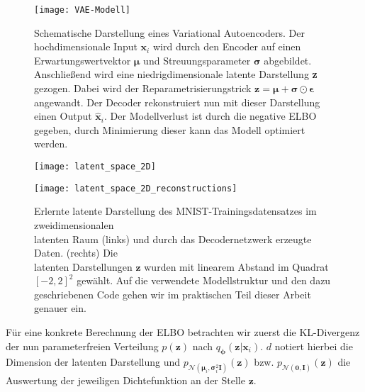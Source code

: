 \documentclass[12pt]{article}
\begin{document}
	\begin{figure}[h!]
		\centering
		\texttt{[image: VAE-Modell]}
		\captionsetup{labelformat=empty}
		\caption{Schematische Darstellung eines Variational Autoencoders. Der hochdimensionale Input $\mathbf{x}_i$ wird durch den Encoder auf einen Erwartungswertvektor $\boldsymbol{\mu}$ und Streuungsparameter $\boldsymbol{\sigma}$ abgebildet. Anschließend wird eine niedrigdimensionale latente Darstellung \textbf{z} gezogen. Dabei wird der Reparametrisierungstrick $\textbf{z}=\boldsymbol{\mu}+\boldsymbol{\sigma} \odot \boldsymbol{\epsilon}$ angewandt. Der Decoder rekonstruiert nun mit dieser Darstellung einen Output $\hat{\mathbf{x}}_i$. Der Modellverlust ist durch die negative ELBO gegeben, durch Minimierung dieser kann das Modell optimiert werden.\\}
		\centering
		\begin{minipage}{.5\textwidth}
			\centering
			\texttt{[image: latent\_space\_2D]}
		\end{minipage}%
		\begin{minipage}{.5\textwidth}
			\centering
			\texttt{[image: latent\_space\_2D\_reconstructions]}
		\end{minipage}
		\captionsetup{labelformat=empty}
		\caption{Erlernte latente Darstellung des MNIST-Trainingsdatensatzes im zweidimensionalen\\ latenten Raum (links) und durch das Decodernetzwerk erzeugte Daten. (rechts) Die \\latenten Darstellungen $\mathbf{z}$ wurden mit linearem Abstand im Quadrat $[-2,2]^2$ gewählt. Auf die verwendete Modellstruktur und den dazu geschriebenen Code gehen wir im praktischen Teil dieser Arbeit genauer ein. }
	\end{figure}
	Für eine konkrete Berechnung der ELBO betrachten wir zuerst die KL-Divergenz der nun parameterfreien Verteilung $p(\textbf{z})$ nach $q_{\boldsymbol\phi}(\textbf{z}|\textbf{x}_{i})$. $d$ notiert hierbei die Dimension der latenten Darstellung und $p_{\mathcal{N}(\boldsymbol\mu_{i},\boldsymbol\sigma_{i}^{2}\mathbf{I})}(\textbf{z})$ bzw. $p_{\mathcal{N}(\mathbf{0},\mathbf{I})}(\textbf{z})$ die Auswertung der jeweiligen Dichtefunktion an der Stelle $\textbf{z}$.
\end{document}
